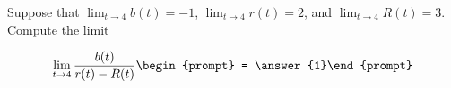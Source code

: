 \documentclass{ximera}
\author{Matthew Carr}
\begin{document}
\begin{exercise}
Suppose that $\lim_{t\to4}b(t)=-1$, $\lim_{t\to4}r(t)=2$, and $\lim_{t\to4}R(t)=3$. Compute the limit

\[
\lim_{t\to 4 } \frac{b(t)}{r(t)-R(t)}\begin{prompt} = \answer{1}\end{prompt}
\]
\end{exercise}
\end{document}
